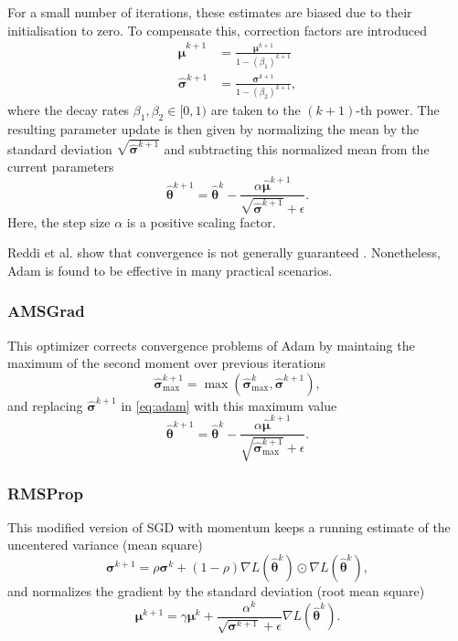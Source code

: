For a small number of iterations, these estimates are biased due to their initialisation to zero. To compensate this, correction factors are introduced
\begin{align*}
    \hat{\bm{\mu}}^{k+1} &= \frac{\bm{\mu}^{k+1}}{1 -(\beta_1)^{k+1}} \\
    \hat{\bm{\sigma}}^{k+1} &= \frac{\bm{\sigma}^{k+1}}{1 -(\beta_2)^{k+1}},
\end{align*}
where the decay rates $\beta_1, \beta_2 \in [0,1)$ are taken to the $(k+1)$-th power.
The resulting parameter update is then given by normalizing the mean by the standard deviation $\sqrt{\hat{\bm{\sigma}}^{k+1}}$ and subtracting this normalized mean from the current parameters
\begin{equation}
\label{eq:adam}
    \hat{\bm{\theta}}^{k+1} = \hat{\bm{\theta}}^k - \frac{\alpha \hat{\bm{\mu}}^{k+1}}{\sqrt{\hat{\bm{\sigma}}^{k+1}} + \epsilon}.
\end{equation}
Here, the step size $\alpha$ is a positive scaling factor.

Reddi et al. show that convergence is not generally guaranteed \cite{Reddi19}. Nonetheless, Adam is found to be effective in many practical scenarios.

\subsubsection{AMSGrad}
This optimizer corrects convergence problems of Adam by maintaing the maximum of the second moment over previous iterations
\begin{equation*}
    \hat{\bm{\sigma}}^{k+1}_{\mathrm{max}} = \max(\hat{\bm{\sigma}}^{k}_{\mathrm{max}}, \hat{\bm{\sigma}}^{k+1}),
\end{equation*}
and replacing $\hat{\bm{\sigma}}^{k+1}$ in \cref{eq:adam} with this maximum value \cite{Reddi19}
\begin{equation}
    \hat{\bm{\theta}}^{k+1} = \hat{\bm{\theta}}^k - \frac{\alpha \hat{\bm{\mu}}^{k+1}}{\sqrt{\hat{\bm{\sigma}}^{k+1}_{\mathrm{max}}} + \epsilon}.
\end{equation}

\subsubsection{RMSProp}
This modified version of SGD with momentum keeps a running estimate of the uncentered variance (mean square)
\begin{equation*}
    \bm{\sigma}^{k+1} = \rho \bm{\sigma}^k + (1 -\rho) \nabla L(\hat{\bm{\theta}}^k) \odot \nabla L(\hat{\bm{\theta}}^k),
\end{equation*}
and normalizes the gradient by the standard deviation (root mean square) \cite{tieleman2012lecture}
\begin{equation*}
    \bm{\mu}^{k+1} = \gamma \bm{\mu}^k + \frac{\alpha^k}{\sqrt{\bm{\sigma}^{k+1}} + \epsilon} \nabla L(\hat{\bm{\theta}}^k).
\end{equation*}

